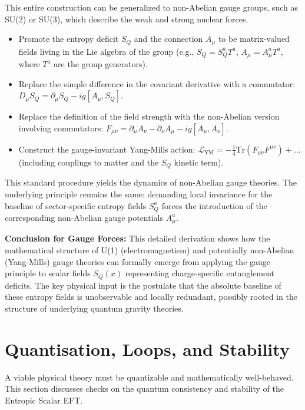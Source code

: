 \documentclass[11pt]{article}
\begin{document}
This entire construction can be generalized to non-Abelian gauge groups, such as SU(2) or SU(3), which describe the weak and strong nuclear forces.
\begin{itemize}
    \item Promote the entropy deficit $S_Q$ and the connection $A_\mu$ to be matrix-valued fields living in the Lie algebra of the group (e.g., $S_Q = S_Q^a T^a$, $A_\mu = A_\mu^a T^a$, where $T^a$ are the group generators).
    \item Replace the simple difference in the covariant derivative with a commutator: $D_\mu S_Q = \partial_\mu S_Q - i g [A_\mu, S_Q]$.
    \item Replace the definition of the field strength with the non-Abelian version involving commutators: $F_{\mu\nu} = \partial_\mu A_\nu - \partial_\nu A_\mu - i g [A_\mu, A_\nu]$.
    \item Construct the gauge-invariant Yang-Mills action: $\mathcal{L}_{\mathrm{YM}} = -\frac{1}{4} \mathrm{Tr}(F_{\mu\nu} F^{\mu\nu}) + ...$ (including couplings to matter and the $S_Q$ kinetic term).
\end{itemize}
This standard procedure yields the dynamics of non-Abelian gauge theories. The underlying principle remains the same: demanding local invariance for the baseline of sector-specific entropy fields $S_Q^a$ forces the introduction of the corresponding non-Abelian gauge potentials $A_\mu^a$.

\textbf{Conclusion for Gauge Forces:} This detailed derivation shows how the mathematical structure of U(1) (electromagnetism) and potentially non-Abelian (Yang-Mills) gauge theories can formally emerge from applying the gauge principle to scalar fields $S_Q(x)$ representing charge-specific entanglement deficits. The key physical input is the postulate that the absolute baseline of these entropy fields is unobservable and locally redundant, possibly rooted in the structure of underlying quantum gravity theories.

\section{Quantisation, Loops, and Stability}\label{sec:loops_app3}

A viable physical theory must be quantizable and mathematically well-behaved. This section discusses checks on the quantum consistency and stability of the Entropic Scalar EFT.
\end{document}

